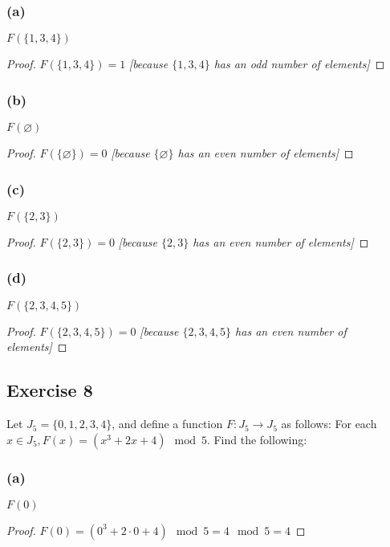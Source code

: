 \documentclass[14pt]{extarticle}
\newcommand{\es}{\varnothing}
\begin{document}
\subsubsection{(a)}
\(F(\{1, 3, 4\})\)

\begin{proof}
    \(F(\{1, 3, 4\}) = 1\) {\it [because \(\{1, 3, 4\}\) has an odd number of elements]}

\end{proof}

\subsubsection{(b)}
\(F(\es)\)

\begin{proof}
    \(F(\{\es\}) = 0\) {\it [because \(\{\es\}\) has an even number of elements]}
\end{proof}

\subsubsection{(c)}
\(F(\{2, 3\})\)

\begin{proof}
    \(F(\{2, 3\}) = 0\) {\it [because \(\{2, 3\}\) has an even number of elements]}
\end{proof}

\subsubsection{(d)}
\(F(\{2, 3, 4, 5\})\)

\begin{proof}
    \(F(\{2, 3, 4, 5\}) = 0\) {\it [because \(\{2, 3, 4, 5\}\) has an even number of elements]}
\end{proof}

\subsection{Exercise 8}
Let \(J_5 = \{0, 1, 2, 3, 4\}\), and define a function \(F: J_5 \to J_5\) as follows: For each \(x \in J_5, F(x) = (x^3
+ 2x + 4) \mod 5\). Find the following:

\subsubsection{(a)}
$F(0)$

\begin{proof}
    \(F(0) = (0^3 + 2 \cdot 0 + 4) \mod 5 = 4 \mod 5 = 4\)

\end{proof}
\end{document}
